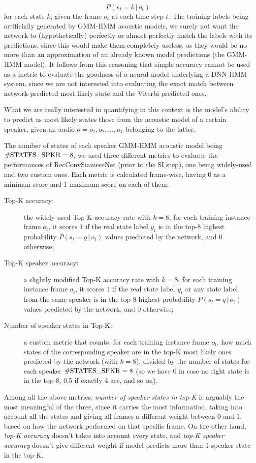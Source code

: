 $$P(s_t = k \, | \, o_t)$$
for each state $k$, given the frame $o_t$ at each time step $t$. The training labels being artificially generated by GMM-HMM acoustic models, we surely not want the network to (hypothetically) perfectly or almost perfectly match the labels with its predictions, since this would make them completely useless, as they would be no more than an approximation of an already known model predictions (the GMM-HMM model).
It follows from this reasoning that simple accuracy cannot be used as a metric to evaluate the goodness of a neural model underlying a DNN-HMM system, since we are not interested into evaluating the exact match between network-predicted most likely state and the Viterbi-predicted ones.

What we are really interested in quantifying in this context is the model's ability to predict as most likely states those from the acoustic model of a certain speaker, given an audio $o = o_1, o_2, ..., o_T$ belonging to the latter.

The number of states of each speaker GMM-HMM acoustic model being $\operatorname{\#STATES\_SPKR} = 8$, we used three different metrics to evaluate the performances of RecConvSiameseNet (prior to the SI step), one being widely-used and two custom ones. Each metric is calculated frame-wise, having $0$ as a minimun score and $1$ maximum score on each of them.

\begin{description}
	\item[Top-K accuracy:] the widely-used Top-K accuracy rate with $k = 8$, for each training instance frame $o_t$, it scores $1$ if the real state label $y_t$ is in the top-8 highest probability $P(s_t = q \, | \, o_t)$ values predicted by the network, and $0$ otherwise;
	
	\item[Top-K speaker accuracy:] a slightly modified Top-K accuracy rate with $k = 8$, for each training instance frame $o_t$, it scores $1$ if the real state label $y_t$ or any state label from the same speaker is in the top-8 highest probability $P(s_t = q \, | \, o_t)$ values predicted by the network, and $0$ otherwise;
	
	\item[Number of speaker states in Top-K:] a custom metric that counts, for each training instance frame $o_t$, how much states of the corresponding speaker are in the top-K most likely ones predicted by the network (with $k=8$), divided by the number of states for each speaker $\operatorname{\#STATES\_SPKR} = 8$ (so we have 0 in case no right state is in the top-8, 0.5 if exactly 4 are, and so on).
\end{description}
Among all the above metrics, \textit{number of speaker states in top-K} is arguably the most meaningful of the three, since it carries the most information, taking into account all the states and giving all frames a different weight between 0 and 1, based on how the network performed on that specific frame. On the other hand, \textit{top-K accuracy} doesn't takes into account every state, and \textit{top-K speaker accuracy} doesn't give different weight if model predicts more than 1 speaker state in the top-K.

